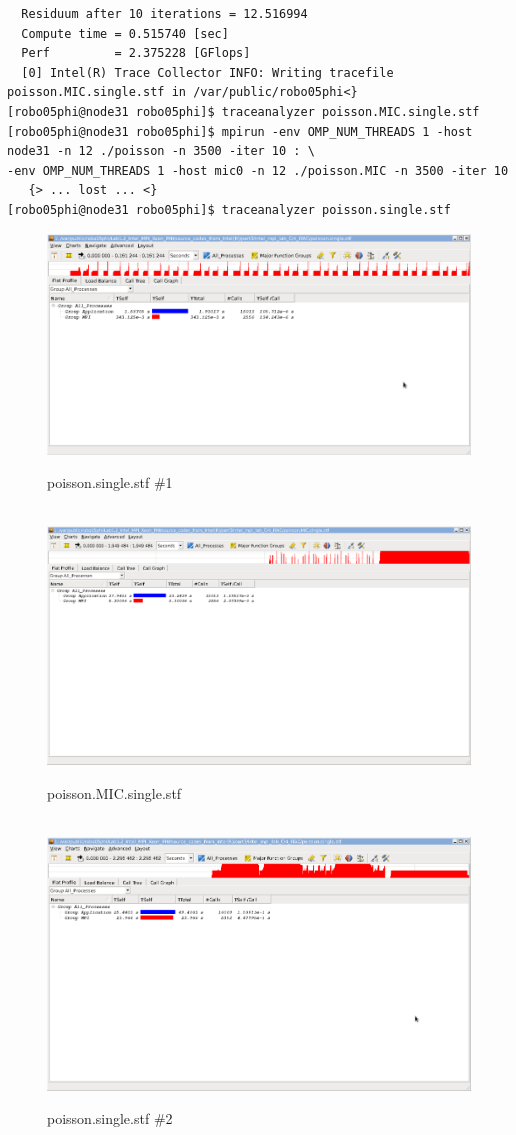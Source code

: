 \documentclass[pscyr,10pt]{hedlab}
\begin{document}
\begin{lstlisting}
  Residuum after 10 iterations = 12.516994 
  Compute time = 0.515740 [sec]
  Perf         = 2.375228 [GFlops]
  [0] Intel(R) Trace Collector INFO: Writing tracefile poisson.MIC.single.stf in /var/public/robo05phi<}
[robo05phi@node31 robo05phi]$ traceanalyzer poisson.MIC.single.stf 
[robo05phi@node31 robo05phi]$ mpirun -env OMP_NUM_THREADS 1 -host node31 -n 12 ./poisson -n 3500 -iter 10 : \
-env OMP_NUM_THREADS 1 -host mic0 -n 12 ./poisson.MIC -n 3500 -iter 10 
   {> ... lost ... <}
[robo05phi@node31 robo05phi]$ traceanalyzer poisson.single.stf 
\end{lstlisting}

  \begin{figure}[p]
    \center
    \includegraphics[width=.8\textwidth]{scr1} \\
    \parbox{.8\textwidth}{\center poisson.single.stf \#1} \\[.5em]
    \includegraphics[width=.8\textwidth]{scr2} \\
    \parbox{.8\textwidth}{\center poisson.MIC.single.stf} \\[.5em]
    \includegraphics[width=.8\textwidth]{scr3} \\
    \parbox{.8\textwidth}{\center poisson.single.stf \#2}
  \end{figure}
\end{document}
